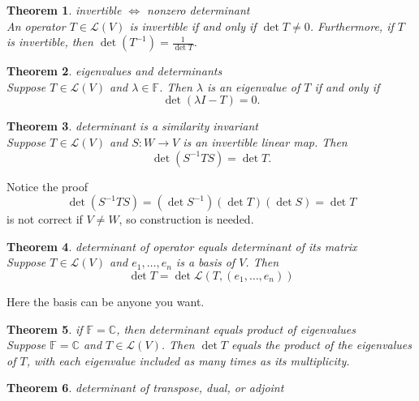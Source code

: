 \documentclass{article}
\newtheorem{theorem}{Theorem}[subsection]
\newcommand{\CC}{\mathbb{C}}
\newcommand{\FF}{\mathbb{F}}
\begin{document}
\begin{CJK}{UTF8}{gkai}
\begin{theorem}
    invertible $\Leftrightarrow$ nonzero determinant\\

    An operator $T \in \mathcal{L}(V)$ is invertible if and only if $\det T \neq 0$. Furthermore, if $T$ is invertible, then $\det(T^{-1}) = \frac{1}{\det T}$.
\end{theorem}

\begin{theorem}
    eigenvalues and determinants\\

    Suppose $T \in \mathcal{L}(V)$ and $\lambda \in \FF$. Then $\lambda$ is an eigenvalue of $T$ if and only if
    \[\det(\lambda I - T) = 0.\]
\end{theorem}

\begin{theorem}
    determinant is a similarity invariant\\

    Suppose $T \in \mathcal{L}(V)$ and $S: W \to V$ is an invertible linear map. Then
    \[\det(S^{-1} T S) = \det T.\]
\end{theorem}

Notice the proof 
\[ \det(S^{-1}TS) = (\det S^{-1})(\det T)(\det S) = \det T\]
is not correct if $V \neq W$, so construction is needed.

\begin{theorem}
    determinant of operator equals determinant of its matrix\\

    Suppose $T \in \mathcal{L}(V)$ and $e_1,\ldots,e_n$ is a basis of $V$. Then
    \[\det T = \det \mathcal{L}(T,(e_1,\ldots,e_n))\]
\end{theorem}

Here the basis can be anyone you want.

\begin{theorem}
    if $\FF = \CC$, then determinant equals product of eigenvalues\\

    Suppose $\FF = \CC$ and $T \in \mathcal{L}(V)$. Then $\det T$ equals the product of the eigenvalues of $T$, with each eigenvalue included as many times as its multiplicity.
\end{theorem}

\begin{theorem}
    determinant of transpose, dual, or adjoint\\


\end{theorem}
\end{CJK}
\end{document}
